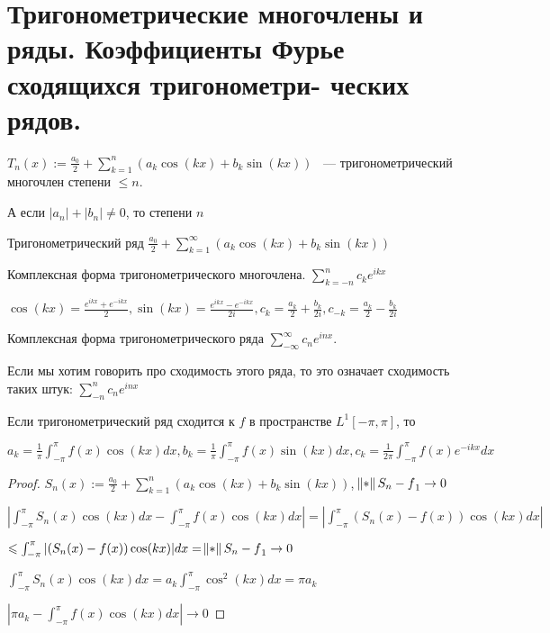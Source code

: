 \section{Тригонометрические многочлены и ряды.
Коэффициенты Фурье сходящихся тригонометри-
ческих рядов.}

\begin{definition}
    $T_n(x):= \frac{a_0}{2} + \sum_{k = 1}^n(a_k \cos(kx) + b_k\sin(kx))$ ~--- тригонометрический
    многочлен степени $\le n$.

    А если $|a_n| + |b_n| \neq 0$, то степени $n$
\end{definition}

\begin{definition}
    Тригонометрический ряд $\frac{a_0}{2} + \sum_{k = 1}^\infty(a_k \cos(kx) + b_k\sin(kx))$
\end{definition}

\begin{definition}
    Комплексная форма тригонометрического многочлена. $\sum_{k= -n}^n c_ke^{ikx}$

    $\cos(kx) = \frac{e^{ikx} + e^{-ikx}}{2}, \sin(kx) = \frac{e^{ikx} - e^{-ikx}}{2i},
        c_k = \frac{a_k}{2} + \frac{b_k}{2i}, c_{-k} =  \frac{a_k}{2} - \frac{b_k}{2i}$

    Комплексная форма тригонометрического ряда $\sum_{-\infty}^\infty c_n e^{inx}$.

    Если мы хотим говорить про сходимость этого ряда, то это означает сходимость
    таких штук: $\sum_{-n}^n c_n e^{inx}$
\end{definition}

\begin{lemma}
    Если тригонометрический ряд сходится к $f$ в пространстве $L^1[-\pi, \pi]$, то

    $a_k = \frac{1}{\pi}\int_{-\pi}^\pi f(x)\cos(kx)dx, b_k = \frac{1}{\pi}\int_{-\pi}^\pi f(x)\sin(kx)dx,
        c_k = \frac{1}{2\pi}\int_{-\pi}^\pi f(x)e^{-ikx}dx$
\end{lemma}

\begin{proof}
    $S_n(x):= \frac{a_0}{2} + \sum_{k = 1}^n(a_k \cos(kx) + b_k \sin(kx))$,
    $\norm{S_n - f}_1\rightarrow 0$

    $|\int_{-\pi}^\pi S_n(x)\cos(kx)dx - \int_{-\pi}^\pi f(x)\cos(kx)dx| = |\int_{-\pi}^\pi (S_n(x) - f(x))\cos(kx)dx|$

    $\le \int_{-\pi}^\pi |(S_n(x) - f(x))\cos(kx)|dx = \norm{S_n - f}_1\rightarrow0$

    $\int_{-\pi}^\pi S_n(x)\cos(kx)dx = a_k \int_{-\pi}^\pi \cos^2(kx)dx = \pi a_k$

    $|\pi a_k - \int_{-\pi}^\pi f(x)\cos(kx)dx| \rightarrow 0$

\end{proof}


